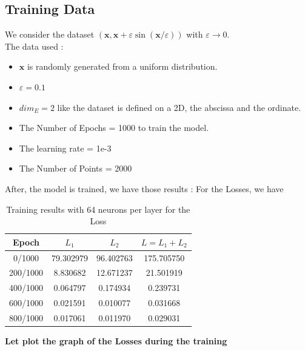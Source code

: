 \documentclass{article}
\begin{document}
    \subsection{Training Data}

        We consider the dataset $(\mathbf{x}, \mathbf{x}+\varepsilon \sin (\mathbf{x} / \varepsilon))$ with $\varepsilon \rightarrow 0$.
        \\
        The data used :
        \begin{itemize}
            \item $\mathbf{x}$ is randomly generated from a uniform distribution.
            \item $\varepsilon = 0.1$
            \item  $dim_E = 2$ like the dataset is defined on a 2D, 
            the abscissa and the ordinate.
            \item The Number of Epochs = 1000  to train the model.
            \item The learning rate = 1e-3
            \item The Number of Points = 2000
        \end{itemize}


        After, the model is trained, we have those results :
        For the Losses, we have 
        \begin{table}[h]
            \centering
            \begin{tabular}{|c|c|c|c|}
            \hline

            Epoch & $L_{1}$ & $L_{2}$ & $L = L_{1} + L_{2}$ \\

            \hline
            0/1000 & 79.302979 & 96.402763 & 175.705750 \\
            200/1000 & 8.830682 & 12.671237 & 21.501919 \\
            400/1000 & 0.064797 & 0.174934 & 0.239731 \\
            600/1000 & 0.021591 & 0.010077 & 0.031668 \\
            800/1000 & 0.017061 & 0.011970 & 0.029031 \\
            \hline
            \end{tabular}
            \caption{Training results with 64 neurons per layer for the Loss}

        \end{table}

        \textbf{Let plot the graph of the Losses during the training}
\end{document}
